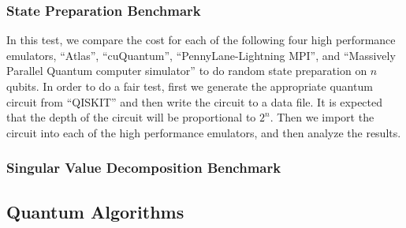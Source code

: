 \documentclass[a4paper,fleqn]{cas-sc}
\begin{document}
\subsubsection{State Preparation Benchmark}

In this test, we compare the cost for each of the following four
high performance emulators, 
``Atlas''\cite{xu2024atlas},
``cuQuantum''\cite{10313722}, 
``PennyLane-Lightning MPI''\cite{kang2025pennylane}, and
``Massively Parallel Quantum computer simulator''\cite{de2019massively} to
do random state preparation on $n$ qubits.  In order to do a fair test,
first we generate the appropriate quantum circuit from 
``QISKIT''\cite{javadi2024quantum} and then write the circuit to a data file.
It is expected that the depth of the circuit will be proportional to 
$2^{n}$.  Then we import the circuit into each of the high performance
emulators, and then analyze the results.

\subsubsection{Singular Value Decomposition Benchmark}

\subsection{Quantum Algorithms}
\end{document}
